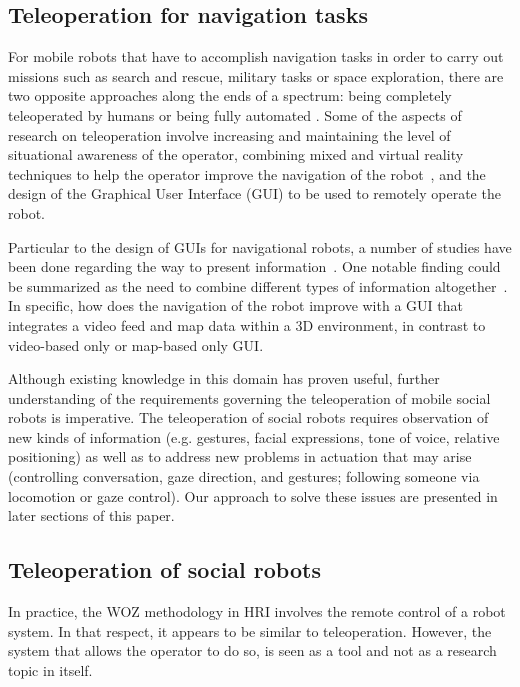 \documentclass[a4paper, 10pt, conference]{ieeeconf}     %
\begin{document}
\subsection{Teleoperation for navigation tasks}
For mobile robots that have to accomplish navigation tasks in order to carry out missions such as search and rescue, military tasks or space exploration, there are two opposite approaches along the ends of a spectrum: being completely teleoperated by humans \cite{burke:moonlight, wells:talon, yamauchi:packbot} or being fully automated \cite{buehler:darpa}. 
Some of the aspects of research on teleoperation involve increasing and maintaining the level of situational awareness of the operator\cite{drury:decomposition, drury:awareness}, combining mixed and virtual reality techniques to help the operator improve the navigation of the robot~\cite{carff:human}, and the design of the Graphical User Interface (GUI) to be used to remotely operate the robot.

Particular to the design of GUIs for navigational robots, a number of studies have been done regarding the way to present information~\cite{meier:sensorfusion, nielsen:comparing}. 
One notable finding could be summarized as the need to combine different types of information altogether~\cite{drury:lassoing, nielsen:ecological}. 
In specific, how does the navigation of the robot improve with a GUI that integrates a video feed and map data within a 3D environment, in contrast to video-based only or map-based only GUI.

Although existing knowledge in this domain has proven useful, further understanding of the requirements governing the teleoperation of mobile social robots is imperative.
The teleoperation of social robots requires observation of new kinds of information (e.g. gestures, facial expressions, tone of voice, relative positioning) as well as to address new problems in actuation that may arise (controlling conversation, gaze direction, and gestures; following someone via locomotion or gaze control). 
Our approach to solve these issues are presented in later sections of this paper. 

\subsection{Teleoperation of social robots}
In practice, the WOZ methodology in HRI involves the remote control of a robot system. 
In that respect, it appears to be similar to teleoperation. 
However, the system that allows the operator to do so, is seen as a tool and not as a research topic in itself.
\end{document}
